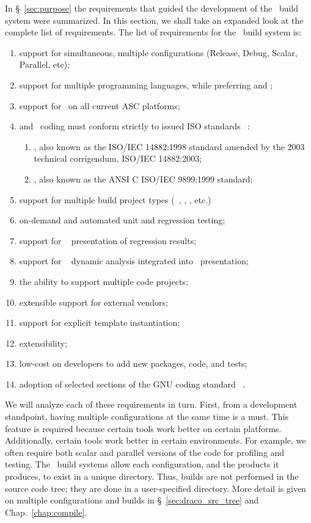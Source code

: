 In \S~\ref{sec:purpose} the requirements that guided the development
of the \draco\ build system were summarized.  In this section, we
shall take an expanded look at the complete list of requirements.  The
list of requirements for the \draco\ build system is:
%
\begin{enumerate}
\item support for simultaneous, multiple configurations (Release, Debug, Scalar, Parallel, etc);
\item support for multiple programming languages, while preferring  and \cpp;
\item support for \cpp\ on all current ASC platforms;
\item {} and \cpp\ coding must conform strictly to issued ISO standards~\cite{ansi:cpp} :
\begin{enumerate}
\item {}, also known as the ISO/IEC 14882:1998 standard amended by the 2003 technical corrigendum, ISO/IEC 14882:2003;
\item {}, also known as the ANSI C ISO/IEC 9899:1999 standard;
\end{enumerate}
\item support for multiple build project types (~\cite{gmake}, , , etc.)
\item on-demand and automated unit and regression testing; 
\item support for \cdash~\cite{cmake,codercdash} presentation of regression results;
\item support for \valgrind~\cite{valgrind} dynamic analysis integrated into \cdash\ presentation; 
\item the ability to support multiple code projects;
\item extensible support for external vendors; 
\item support for explicit template instantiation; 
\item extensibility;
\item low-cost on developers to add new packages, code, and tests; 
\item  adoption of selected sections of the GNU coding standard~\cite{gnu} .
\end{enumerate}
%
We will analyze each of these requirements in turn.  First, from a
development standpoint, having multiple configurations at the same
time is a must.  This feature is required because certain tools work
better on certain platforms.  Additionally, certain tools work better
in certain environments.  For example, we often require both scalar
and parallel versions of the code for profiling and testing.  The
\draco\ build systems allow each configuration, and the products it
produces, to exist in a unique directory.  Thus, builds are not
performed in the source code tree; they are done in a user-specified
directory.  More detail is given on multiple configurations and builds 
in \S~\ref{sec:draco_src_tree} and Chap.~\ref{chap:compile}.

